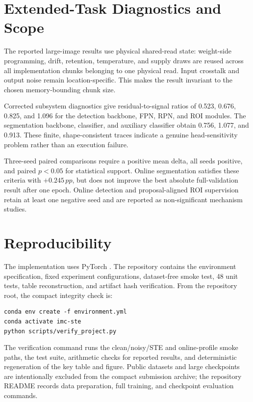 \documentclass[10pt,twocolumn,letterpaper]{article}
\newcommand{\pp}{\,pp}
\begin{document}
\section{Extended-Task Diagnostics and Scope}
\label{app:optional}

The reported large-image results use physical shared-read state: weight-side
programming, drift, retention, temperature, and supply draws are reused across
all implementation chunks belonging to one physical read.  Input crosstalk and
output noise remain location-specific.  This makes the result invariant to the
chosen memory-bounding chunk size.

Corrected subsystem diagnostics give residual-to-signal ratios of 0.523, 0.676,
0.825, and 1.096 for the detection backbone, FPN, RPN, and ROI modules.  The
segmentation backbone, classifier, and auxiliary classifier obtain 0.756,
1.077, and 0.913.  These finite, shape-consistent traces indicate a genuine
head-sensitivity problem rather than an execution failure.

Three-seed paired comparisons require a positive mean delta, all seeds positive,
and paired $p<0.05$ for statistical support.  Online segmentation satisfies
these criteria with $+0.245\pp$, but does not improve the best absolute
full-validation result after one epoch.  Online detection and proposal-aligned
ROI supervision retain at least one negative seed and are reported as
non-significant mechanism studies.

\section{Reproducibility}
\label{app:reproducibility}

The implementation uses PyTorch \citep{paszke2019pytorch}.  The repository
contains the environment specification, fixed experiment configurations,
dataset-free smoke test, 48 unit tests, table reconstruction, and artifact hash
verification.  From the repository root, the compact integrity check is:
\begin{verbatim}
conda env create -f environment.yml
conda activate imc-ste
python scripts/verify_project.py
\end{verbatim}
The verification command runs the clean/noisy/STE and online-profile smoke
paths, the test suite, arithmetic checks for reported results, and deterministic
regeneration of the key table and figure.  Public datasets and large
checkpoints are intentionally excluded from the compact submission archive;
the repository README records data preparation, full training, and checkpoint
evaluation commands.
\end{document}
